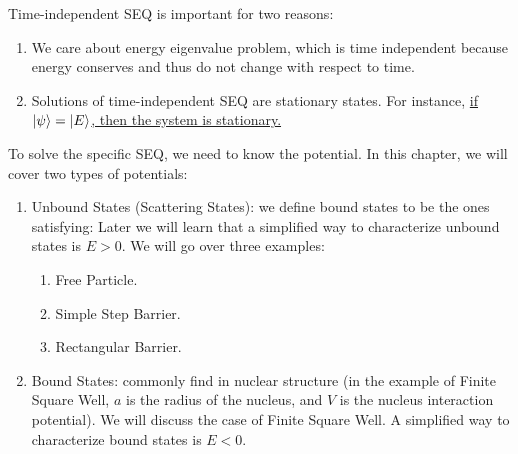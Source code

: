 \documentclass{school-22.101-notes}
\date{September 19, 2011}
\begin{document}
\maketitle

Time-independent SEQ is important for two reasons:
\begin{enumerate}
\item We care about energy eigenvalue problem, which is time independent because energy conserves and thus do not change with respect to time. 
\item Solutions of time-independent SEQ are stationary states. For instance, \uline{if $\left| \psi \right> = \left| E \right>$, then the system is stationary.}
\end{enumerate}

To solve the specific SEQ, we need to know the potential. In this chapter, we will cover two types of potentials:
\begin{enumerate}
\item Unbound States (Scattering States): we define bound states to be the ones satisfying:
Later we will learn that a simplified way to characterize unbound states is $E > 0$. We will go over three examples:
\begin{enumerate}
\item Free Particle.
\item Simple Step Barrier.
\item Rectangular Barrier.
\end{enumerate}

\item Bound States: commonly find in nuclear structure (in the example of Finite Square Well, $a$ is the radius of the nucleus, and $V$ is the nucleus interaction potential). We will discuss the case of Finite Square Well. A simplified way to characterize bound states is $E<0$. 
\end{enumerate}
\end{document}
